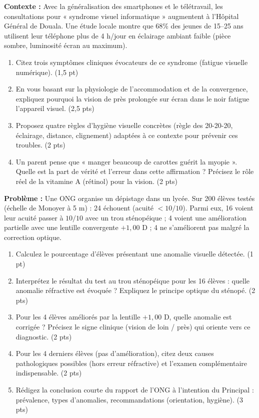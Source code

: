 \documentclass[11pt]{article}
\begin{document}
\begin{exercice}
    \textbf{Contexte :} Avec la généralisation des smartphones et le télétravail, les consultations pour « syndrome visuel informatique » augmentent à l'Hôpital Général de Douala. Une étude locale montre que 68\% des jeunes de 15--25 ans utilisent leur téléphone plus de 4 h/jour en éclairage ambiant faible (pièce sombre, luminosité écran au maximum).
    \begin{enumerate}
        \item Citez trois symptômes cliniques évocateurs de ce syndrome (fatigue visuelle numérique). (1,5 pt)
        \item En vous basant sur la physiologie de l'accommodation et de la convergence, expliquez pourquoi la vision de près prolongée sur écran dans le noir fatigue l'appareil visuel. (2,5 pts)
        \item Proposez quatre règles d'hygiène visuelle concrètes (règle des 20-20-20, éclairage, distance, clignement) adaptées à ce contexte pour prévenir ces troubles. (2 pts)
        \item Un parent pense que « manger beaucoup de carottes guérit la myopie ». Quelle est la part de vérité et l'erreur dans cette affirmation ? Précisez le rôle réel de la vitamine A (rétinol) pour la vision. (2 pts)
    \end{enumerate}
\end{exercice}

\begin{exercice}
    \textbf{Problème :} Une ONG organise un dépistage dans un lycée. Sur 200 élèves testés (échelle de Monoyer à 5 m) : 24 échouent (acuité $< 10/10$). Parmi eux, 16 voient leur acuité passer à $10/10$ avec un trou sténopéique ; 4 voient une amélioration partielle avec une lentille convergente $+1,00$ D ; 4 ne s'améliorent pas malgré la correction optique.
    \begin{enumerate}
        \item Calculez le pourcentage d'élèves présentant une anomalie visuelle détectée. (1 pt)
        \item Interprétez le résultat du test au trou sténopéique pour les 16 élèves : quelle anomalie réfractive est évoquée ? Expliquez le principe optique du sténopé. (2 pts)
        \item Pour les 4 élèves améliorés par la lentille $+1,00$ D, quelle anomalie est corrigée ? Précisez le signe clinique (vision de loin / près) qui oriente vers ce diagnostic. (2 pts)
        \item Pour les 4 derniers élèves (pas d'amélioration), citez deux causes pathologiques possibles (hors erreur réfractive) et l'examen complémentaire indispensable. (2 pts)
        \item Rédigez la conclusion courte du rapport de l'ONG à l'intention du Principal : prévalence, types d'anomalies, recommandations (orientation, hygiène). (3 pts)
    \end{enumerate}
\end{exercice}
\end{document}
